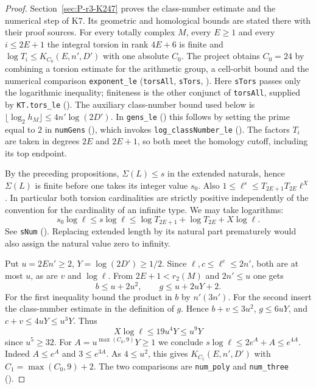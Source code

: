 \begin{proof}
Section~\ref{sec:P-r3-K247} proves the class-number estimate and the numerical step of K7. Its geometric and homological bounds are stated there with their proof sources. For every totally complex $M$, every $E\ge1$
and every $i\le2E+1$ the integral torsion in rank $4E+6$ is finite and
$\log T_i\le K_{C_0}(E,n',D')$ with one absolute $C_0$. The project
obtains $C_0=24$ by combining a torsion estimate for the arithmetic group,
a cell-orbit bound and the numerical comparison \nolinkurl{exponent_le}
(\nolinkurl{torsAll}, \nolinkurl{sTors}, ).
Here \nolinkurl{sTors} passes only the logarithmic inequality;
finiteness is the other conjunct of \nolinkurl{torsAll}, supplied by
\nolinkurl{KT.tors_le} ().
The auxiliary class-number bound used below is
$\lfloor\log_2 h_M\rfloor\le4n'\log(2D')$. In \nolinkurl{gens_le}
() this follows by setting the prime equal
to $2$ in \nolinkurl{numGens} (),
which invokes \nolinkurl{log_classNumber_le} ().
The factors $T_i$ are taken in degrees $2E$ and $2E+1$, so both meet the
homology cutoff, including its top endpoint.

By the preceding propositions, $\Sigma(L)\le s$ in the extended
naturals, hence $\Sigma(L)$ is finite before one takes its integer value
$s_0$. Also $1\le\ell^s\le T_{2E+1}T_{2E}\ell^X$. In particular both
torsion cardinalities are strictly positive independently of the convention
for the cardinality of an infinite type. We may take logarithms:
\[
  s_0\log\ell\le s\log\ell
  \le \log T_{2E+1}+\log T_{2E}+X\log\ell .
\]
See \nolinkurl{sNum} (). Replacing extended
length by its natural part prematurely would also assign the natural
value zero to infinity.

Put $u=2En'\ge2$, $Y=\log(2D')\ge1/2$. Since $\ell,c\le\ell^c\le2n'$,
both are at most $u$, as are $v$ and $\log\ell$. From $2E+1<r_2(M)$
and $2n'\le u$ one gets
\[
 b\le u+2u^2,\qquad g\le u+2uY+2 .
\]
For the first inequality bound the product in $b$ by $n'(3n')$.
For the second insert the class-number estimate in the definition of
$g$. Hence $b+v\le3u^2$, $g\le6uY$, and $c+v\le4uY\le u^3Y$. Thus
\[
 X\log\ell\le19u^4Y\le u^9Y
\]
since $u^5\ge32$. For $A=u^{\max(C_0,9)}Y\ge1$ we conclude
$s\log\ell\le2e^A+A\le e^{4A}$. Indeed $A\le e^A$ and $3\le e^{3A}$.
As $4\le u^2$, this gives $K_{C_1}(E,n',D')$ with
$C_1=\max(C_0,9)+2$. The two comparisons are \nolinkurl{num_poly} and
\nolinkurl{num_three} ().


\end{proof}
